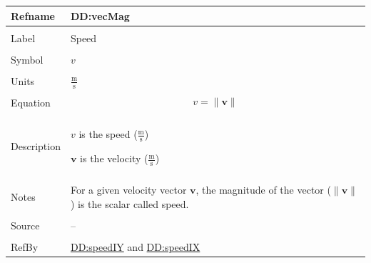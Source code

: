 \documentclass[12pt]{article}
\begin{document}
\vspace{\baselineskip}
\noindent
\begin{minipage}{\textwidth}
\begin{tabular}{>{\raggedright}p{}>{\raggedright\arraybackslash}p{}}
\toprule \textbf{Refname} & \textbf{DD:vecMag}
\label{DD:vecMag}
\\ \midrule \\
Label & Speed
        
\\ \midrule \\
Symbol & $v$
         
\\ \midrule \\
Units & $\frac{\text{m}}{\text{s}}$
        
\\ \midrule \\
Equation & \begin{displaymath}
           v=\|\symbf{v}\|
           \end{displaymath}
\\ \midrule \\
Description & \begin{symbDescription}
              \item{$v$ is the speed ($\frac{\text{m}}{\text{s}}$)}
              \item{$\symbf{v}$ is the velocity ($\frac{\text{m}}{\text{s}}$)}
              \end{symbDescription}
\\ \midrule \\
Notes & For a given velocity vector $\symbf{v}$, the magnitude of the vector ($\|\symbf{v}\|$) is the scalar called speed.
        
\\ \midrule \\
Source & --
         
\\ \midrule \\
RefBy & \hyperref[DD:speedIY]{DD:speedIY} and \hyperref[DD:speedIX]{DD:speedIX}
        
\\ \bottomrule
\end{tabular}
\end{minipage}
\end{document}
